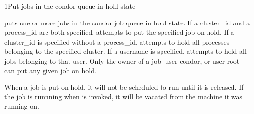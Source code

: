 \begin{ManPage}{}{1}{Put jobs in the condor queue in hold state}
\label{man-condor-hold}
\Synopsis {}

\Description

 puts one or more jobs in the condor job queue in hold state.  If a
cluster\_id and a process\_id are both specified,  attempts to
put the specified job on hold. If a cluster\_id is specified
without a process\_id,  attempts to hold all processes belonging
to the specified cluster. If a username is specified,  attempts to
hold all jobs belonging to that user. Only the owner of a job, user condor,
or user root can put any given job on hold.

When a job is put on hold, it will not be scheduled to run until it is released.
If the job is runnning when  is invoked, it will be vacated from the
machine it was running on.

\begin{Options}
\end{Options}

\end{ManPage}
